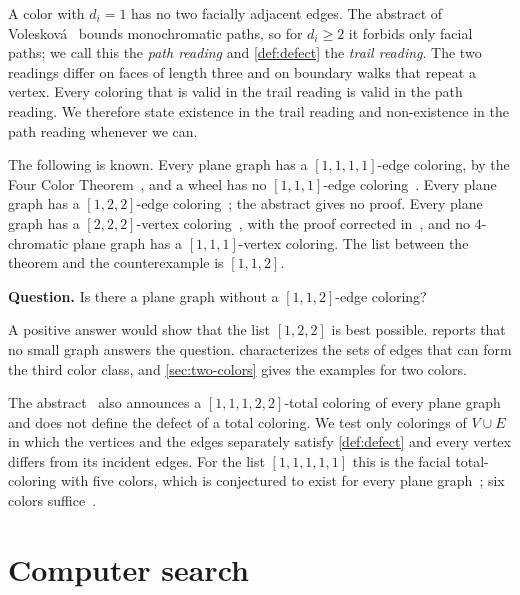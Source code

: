 \documentclass[11pt,a4paper]{article}
\begin{document}
A color with $d_i=1$ has no two facially adjacent edges.
The abstract of Volesková~\cite{Voleskova2026FacialDefect} bounds monochromatic paths, so for $d_i\ge 2$ it forbids only facial paths; we call this the \emph{path reading} and \cref{def:defect} the \emph{trail reading}.
The two readings differ on faces of length three and on boundary walks that repeat a vertex.
Every coloring that is valid in the trail reading is valid in the path reading.
We therefore state existence in the trail reading and non-existence in the path reading whenever we can.

The following is known.
Every plane graph has a $[1,1,1,1]$-edge coloring, by the Four Color Theorem~\cite{AppelHaken1976}, and a wheel has no $[1,1,1]$-edge coloring~\cite[p.~631]{Czap2019FacialRST}.
Every plane graph has a $[1,2,2]$-edge coloring~\cite{Voleskova2026FacialDefect}; the abstract gives no proof.
Every plane graph has a $[2,2,2]$-vertex coloring~\cite[Theorem~3]{Jendrol2026ThreeColoring}, with the proof corrected in~\cite{Jendrol2026Corrigendum}, and no $4$-chromatic plane graph has a $[1,1,1]$-vertex coloring.
The list between the theorem and the counterexample is $[1,1,2]$.

\medskip
\noindent\textbf{Question.} Is there a plane graph without a $[1,1,2]$-edge coloring?
\medskip

A positive answer would show that the list $[1,2,2]$ is best possible.
 reports that no small graph answers the question.
 characterizes the sets of edges that can form the third color class, and \cref{sec:two-colors} gives the examples for two colors.

The abstract~\cite{Voleskova2026FacialDefect} also announces a $[1,1,1,2,2]$-total coloring of every plane graph and does not define the defect of a total coloring.
We test only colorings of $V\cup E$ in which the vertices and the edges separately satisfy \cref{def:defect} and every vertex differs from its incident edges.
For the list $[1,1,1,1,1]$ this is the facial total-coloring with five colors, which is conjectured to exist for every plane graph~\cite[Conjecture~15]{Czap2019FacialRST}; six colors suffice~\cite[Theorem~14]{Czap2019FacialRST}.

\section{Computer search}
\label{sec:search}
\end{document}
